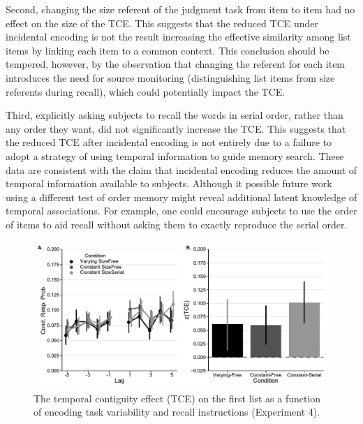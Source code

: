 \documentclass[man,natbib,floatsintext]{apa6} %
\begin{document}
Second, changing the size referent of the judgment task from item to item had no effect on the size of the TCE. This suggests that the reduced TCE under incidental encoding is not the result increasing the effective similarity among list items by linking each item to a common context. This conclusion should be tempered, however, by the observation that changing the referent for each item introduces the need for source monitoring (distinguishing list items from size referents during recall), which could potentially impact the TCE.  

Third, explicitly asking subjects to recall the words in serial order, rather than any order they want, did not significantly increase the TCE. This suggests that the reduced TCE after incidental encoding is not entirely due to a failure to adopt a strategy of using temporal information to guide memory search. These data are consistent with the claim that incidental encoding reduces the amount of temporal information available to subjects. Although it possible future work using a different test of order memory might reveal additional latent knowledge of temporal associations. For example, one could encourage subjects to use the order of items to aid recall without asking them to exactly reproduce the serial order. %


\begin{figure}%
\includegraphics{figures/E4_crp_list1.pdf}
\caption{The temporal contiguity effect (TCE) on the first list as a function of encoding task variability and recall instructions (Experiment 4).\paneltext}
\label{e4_l1_crp}
\end{figure}

\color{black}
\end{document}
